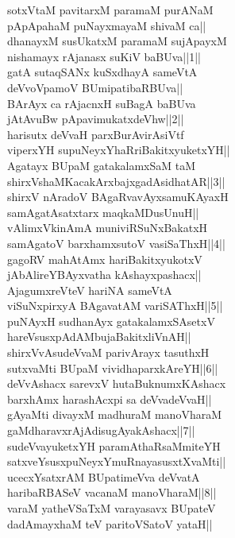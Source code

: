 \documentclass{article}
\begin{document}
sotxVtaM pavitarxM paramaM purANaM\\
pApApahaM puNayxmayaM shivaM ca||\\
dhanayxM susUkatxM paramaM sujApayxM\\
nishamayx rAjanasx suKiV baBUva||1||\\
gatA sutaqSANx kuSxdhayA sameVtA\\
deVvoVpamoV BUmipatibaRBUva||\\
BArAyx ca rAjacnxH suBagA baBUva\\
jAtAvuBw pApavimukatxdeVhw||2||\\
harisutx deVvaH parxBurAvirAsiVtf\\
viperxYH supuNeyxYhaRriBakitxyuketxYH||\\
Agatayx BUpaM gatakalamxSaM taM\\
shirxVshaMKacakArxbajxgadAsidhatAR||3||\\
shirxV nAradoV BAgaRvavAyxsamuKAyaxH\\
samAgatAsatxtarx maqkaMDusUnuH||\\
vAlimxVkinAmA muniviRSuNxBakatxH\\
samAgatoV barxhamxsutoV vasiSaThxH||4||\\
gagoRV mahAtAmx hariBakitxyukotxV\\
jAbAlireYBAyxvatha kAshayxpashacx||\\
AjagumxreVteV hariNA sameVtA\\
viSuNxpirxyA BAgavatAM variSAThxH||5||\\
puNAyxH sudhanAyx gatakalamxSAsetxV\\
hareVsusxpAdAMbujaBakitxliVnAH||\\
shirxVvAsudeVvaM parivArayx tasuthxH\\
sutxvaMti BUpaM vividhaparxkAreYH||6||\\
deVvAshacx sarevxV hutaBuknumxKAshacx\\
barxhAmx harashAcxpi sa deVvadeVvaH||\\
gAyaMti divayxM madhuraM manoVharaM\\
gaMdharavxrAjAdisugAyakAshacx||7||\\
sudeVvayuketxYH paramAthaRsaMmiteYH\\
satxveYsusxpuNeyxYmuRnayasusxtXvaMti||\\
ucecxYsatxrAM BUpatimeVva deVvatA\\
haribaRBASeV vacanaM manoVharaM||8||\\
varaM yatheVSaTxM varayasavx BUpateV\\
dadAmayxhaM teV paritoVSatoV yataH||\\
\end{document}
